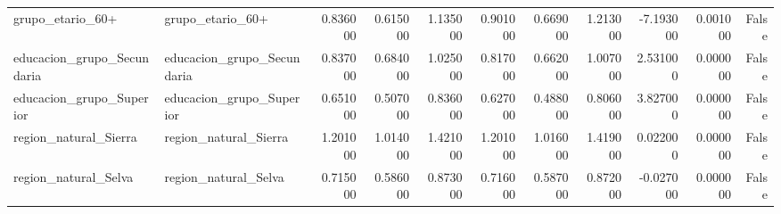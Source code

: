 \begin{table}[htbp]
\begin{tabular}{llrrrrrrrrr}
grupo\_etario\_60+ & grupo\_etario\_60+ & 0.836000 & 0.615000 & 1.135000 & 0.901000 & 0.669000 & 1.213000 & -7.193000 & 0.001000 & False \\
educacion\_grupo\_Secundaria & educacion\_grupo\_Secundaria & 0.837000 & 0.684000 & 1.025000 & 0.817000 & 0.662000 & 1.007000 & 2.531000 & 0.000000 & False \\
educacion\_grupo\_Superior & educacion\_grupo\_Superior & 0.651000 & 0.507000 & 0.836000 & 0.627000 & 0.488000 & 0.806000 & 3.827000 & 0.000000 & False \\
region\_natural\_Sierra & region\_natural\_Sierra & 1.201000 & 1.014000 & 1.421000 & 1.201000 & 1.016000 & 1.419000 & 0.022000 & 0.000000 & False \\
region\_natural\_Selva & region\_natural\_Selva & 0.715000 & 0.586000 & 0.873000 & 0.716000 & 0.587000 & 0.872000 & -0.027000 & 0.000000 & False \\
\bottomrule
\end{tabular}
\end{table}
